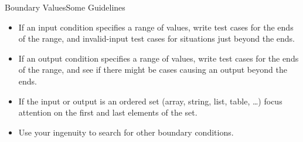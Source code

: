 \begin{Frame}{Boundary Values}{Some Guidelines}
  \begin{itemize}
    \item If an input condition specifies a range of values, write test cases for the ends of the range, and invalid-input test cases for situations just beyond the ends.
    \item If an output condition specifies a range of values, write test cases for the ends of the range, and see if there might be cases causing an output beyond the ends.
    \item If the input or output is an ordered set (array, string, list, table, \ldots) focus attention on the first and last elements of the set.
    \item Use your ingenuity to search for other boundary conditions.
  \end{itemize}
\end{Frame}

